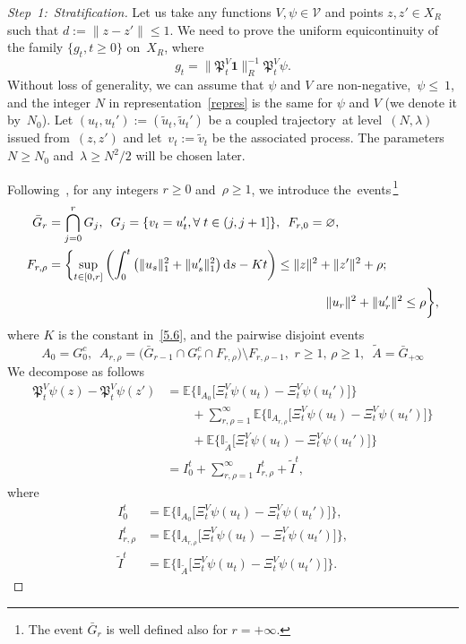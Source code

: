 \documentclass[AHL,Unicode,longabstracts]{cedram}
\newcommand{\mek}{{\mathbf 1}}
\newcommand{\I}{{\mathbb I}}
\newcommand{\E}{{\mathbb E}}
\newcommand{\VV}{{\mathcal V}}
\newcommand{\la}{\lambda}
\newcommand{\ty}{\infty}
\newcommand{\PPPP}{{\mathfrak P}}
\newcommand{\dd}{\mathrm{d}}
\newenvironment{step}{\begin{proof}}{\let\qed\relax \end{proof}}
\let\oldforall\forall
\renewcommand*{\forall}{\mathrel{\oldforall}}
\begin{document}
\begin{step}[Step~1:~Stratification]
Let us take any functions $V,\psi\in \VV$ and points $ z,z' \in X_R$ such that $d:=\|z-z'\|\le1$. We need to prove the uniform equicontinuity of the family $\{g_t,t\ge 0\}$ on~$X_R$, where
\[
g_t= \|\PPPP_t^V{\mek}\|_R^{-1}\PPPP_t^V\psi.
\]
Without loss of generality, we can assume that $\psi$ and $V$ are non-negative,~$ \psi\le~1$, and the integer $N$ in representation~\eqref{repres} is the same for $\psi$ and $V$ (we denote it by~$N_0$). Let $(u_t,u_t'):=(\tilde u_t,\tilde u_t')$ be a coupled trajectory~at level~$(N,\la)$ issued from~$(z,z')$ and let~$v_t:=\tilde v_t$ be the associated process. The parameters $N\ge N_0$ and~$\lambda\ge N^2/2$ will be chosen later.

Following~\cite{MN-2015,JNPS-2014}, for any integers $r\ge0$ and~$\rho\ge1$, we introduce the~events\,\footnote{The event $\bar G_r$ is well defined also for $r=+\ty$.}
\begin{align*}
\bar G_r &=\bigcap_{j=0}^rG_j, \,\,\, G_j=\{ v_t =u_t', \forall t\in (j,j+1]\}, \,\,\, F_{r,0}=\varnothing, \\
F_{r,\rho}&=\biggl\{ \sup_{t \in [0,r]} \left(\int_0^t \left(\| u_s \|_1^2+\| u'_s\|_1^2\right)\dd s-Kt \right) \le \|z\|^2+ \|z'\|^2 + \rho; \\
& \mkern 400mu \|u_r\|^2+ \|u_r'\|^2 \le \rho \biggr\},
\end{align*}
where $K$ is the constant in~\eqref{5.6}, and the pairwise disjoint events
\[
A_0=G_0^c, \,\,\, A_{r,\rho}=\bigl(\bar G_{r-1}\cap G_r^c\cap F_{r,\rho}\bigr)\setminus F_{r,\rho-1},\,\, r\ge1,\,\rho\ge1, \,\,\, \tilde A = \bar G_{+\ty}
\]
We decompose as follows
\begin{align}
\PPPP_t^V\psi(z)-\PPPP_t^V\psi(z') &= \E \bigl\{\I_{A_{0}}\bigl[\Xi^V_t\psi (u_t) -\Xi^V_t\psi (u_t')\bigr] \bigr\}\nonumber\\
&\qquad+ \sum_{r,\rho=1}^{\ty} \E \bigl\{\I_{A_{r,\rho}}\bigl[\Xi^V_t\psi (u_t) -\Xi^V_t\psi (u_t')\bigr] \bigr\}\nonumber\\
&\qquad+ \E \bigl\{\I_{\tilde A}\bigl[\Xi^V_t\psi (u_t) -\Xi^V_t\psi (u_t')\bigr] \bigr\}\nonumber\\
&=I_0^t+ \sum_{r,\rho=1}^{\ty} I_{r,\rho}^{t}+ \tilde I^{t},\label{E:7.3}
\end{align}
where
\begin{align*}
I_{0}^{t}&=\E \bigl\{\I_{A_{0}}[\Xi^V_t\psi (u_t) -\Xi^V_t\psi (u_t')\bigr] \bigr\},\\
I_{r,\rho}^{t}&=\E \bigl\{\I_{A_{r,\rho}}[\Xi^V_t\psi (u_t) -\Xi^V_t\psi (u_t')\bigr] \bigr\},\\
\tilde I^{t}&=\E \bigl\{\I_{\tilde A}\bigl[\Xi^V_t\psi (u_t) -\Xi^V_t\psi (u_t')\bigr] \bigr\}.
\end{align*}
\end{step}
\end{document}

